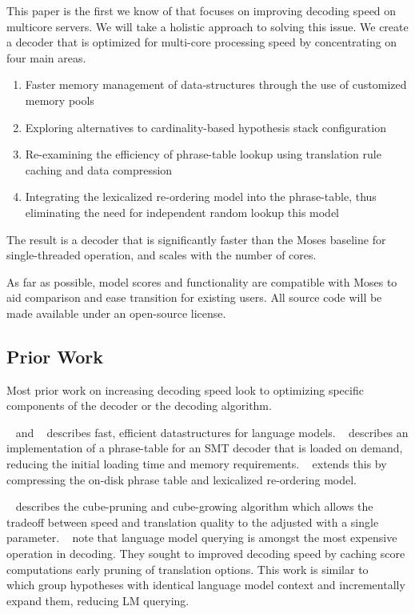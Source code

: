 \documentclass[11pt]{article}
\begin{document}
This paper is the first we know of that focuses on improving decoding speed on multicore servers. We will take a holistic approach to solving this issue. We create a decoder that is optimized for multi-core processing speed by concentrating on four main areas.
\begin{enumerate}
  \item \vspace{-2 mm} Faster memory management of data-structures through the use of customized memory pools
  \item \vspace{-2 mm} Exploring alternatives to cardinality-based hypothesis stack configuration
  \item \vspace{-2 mm} Re-examining the efficiency of phrase-table lookup using translation rule caching and data compression
  \item \vspace{-2 mm} Integrating the lexicalized re-ordering model into the phrase-table, thus eliminating the need for independent random lookup this model 
\end{enumerate}
The result is a decoder that is significantly faster than the Moses baseline for single-threaded operation, and scales with the number of cores.

As far as possible, model scores and functionality are compatible with Moses to aid comparison and ease transition for existing users. All source code will be made available under an open-source license.

\subsection{Prior Work}

Most prior work on increasing decoding speed look to optimizing specific components of the decoder or the decoding algorithm. 

~ and ~ describes fast, efficient datastructures for language models. ~ describes an implementation of a phrase-table for an SMT decoder that is loaded on demand, reducing the initial loading time and memory requirements. ~ extends this by compressing the on-disk phrase table and lexicalized re-ordering model. 

~ describes the cube-pruning and cube-growing algorithm which allows the tradeoff between speed and translation quality to the adjusted with a single parameter. ~ note that language model querying is amongst the most expensive operation in decoding. They sought to improved decoding speed by caching score computations early pruning of translation options. This work is similar to ~ which group hypotheses with identical language model context and incrementally expand them, reducing LM querying.
\end{document}
